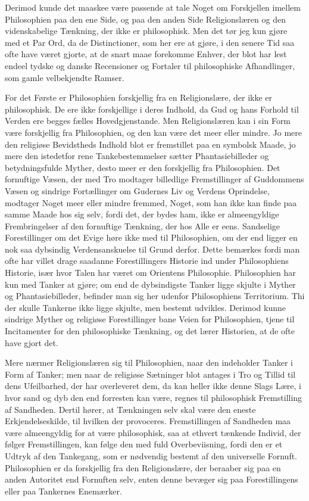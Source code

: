 \documentclass[12pt]{article}
\begin{document}
Derimod kunde det maaskee være passende at tale Noget om
Forskjellen imellem Philosophien paa den ene Side, og paa
den anden Side Religionslæren og den videnskabelige Tænkning,
der ikke er philosophisk. Men det tør jeg kun gjøre med et
Par Ord, da de Distinctioner, som her ere at gjøre, i den
senere Tid saa ofte have været gjorte, at de snart maae
forekomme Enhver, der blot har lest endeel tydske og danske
Recensioner og Fortaler til philosophiske Afhandlinger, som
gamle velbekjendte Ramser.

For det Første er Philosophien forskjellig fra en Religionslære,
der ikke er philosophisk. De ere ikke forskjellige i deres
Indhold, da Gud og hans Forhold til Verden ere begges fælles
Hovedgjenstande. Men Religionslæren kan i sin Form være
forskjellig fra Philosophien, og den kan være det meer eller
mindre. Jo mere den religiøse Bevidstheds Indhold blot er
fremstillet paa en symbolsk Maade, jo mere den istedetfor rene
Tankebestemmelser sætter Phantasiebilleder og betydningsfulde
Myther, desto meer er den forskjellig fra Philosophien. Det
fornuftige Væsen, der med Tro modtager billedlige Fremstillinger
af Guddommens Væsen og sindrige Fortællinger om Gudernes Liv og
Verdens Oprindelse, modtager Noget meer eller mindre fremmed,
Noget, som han ikke kan finde paa samme Maade hos sig selv,
fordi det, der bydes ham, ikke er almeengyldige Frembringelser
af den fornuftige Tænkning, der hos Alle er eens. Sandselige
Forestillinger om det Evige høre ikke med til Philosophien,
om der end ligger en nok saa dybsindig Verdensanskuelse til
Grund derfor. Dette bemærkes fordi man ofte har villet drage
saadanne Forestillingers Historie ind under Philosophiens
Historie, især hvor Talen har været om Orientens Philosophie.
Philosophien har kun med Tanker at gjøre; om end de
dybsindigste Tanker ligge skjulte i Myther og Phantasiebilleder,
befinder man sig her udenfor Philosophiens Territorium. Thi
der skulle Tankerne ikke ligge skjulte, men bestemt udvikles.
Derimod kunne sindrige Myther og religiøse Forestillinger bane
Veien for Philosophien, tjene til Incitamenter for den
philosophiske Tænkning, og det lærer Historien, at de ofte
have gjort det.

Mere nærmer Religionslæren sig til Philosophien, naar den
indeholder Tanker i Form af Tanker; men naar de religiøse
Sætninger blot antages i Tro og Tillid til dens Ufeilbarhed,
der har overleveret dem, da kan heller ikke denne Slags Lære,
i hvor sand og dyb den end forresten kan være, regnes til
philosophisk Fremstilling af Sandheden. Dertil hører, at
Tænkningen selv skal være den eneste Erkjendelseskilde, til
hvilken der provoceres. Fremstillingen af Sandheden maa være
almeengyldig for at være philosophisk, saa at ethvert tænkende
Individ, der følger Fremstillingen, kan følge den med fuld
Overbeviisning, fordi den er et Udtryk af den Tankegang, som
er nødvendig bestemt af den universelle Fornuft. Philosophien
er da forskjellig fra den Religionslære, der beraaber sig paa
en anden Autoritet end Fornuften selv, enten denne bevæger sig
paa Forestillingens eller paa Tankernes Enemærker.
\end{document}
